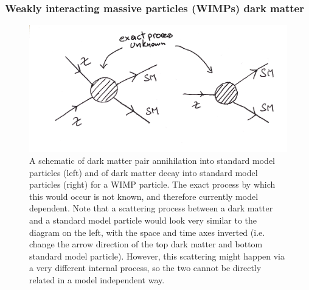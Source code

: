 \subsubsection{Weakly interacting massive particles (WIMPs) dark matter}\label{sec:WIMPS}

\begin{figure}[hbtp]
    \centering
    \includegraphics[width=\textwidth]{figures/DM_processes.pdf}
    \caption{A schematic of dark matter pair annihilation into standard model particles (left) and of dark matter decay into standard model particles (right) for a WIMP particle. The exact process by which this would occur is not known, and therefore currently model dependent. Note that a scattering process between a dark matter and a standard model particle would look very similar to the diagram on the left, with the space and time axes inverted (i.e. change the arrow direction of the top dark matter and bottom standard model particle). However, this scattering might happen via a very different internal process, so the two cannot be directly related in a model independent way.}
    \label{fig:DM_ann_decay_processes}
\end{figure}
